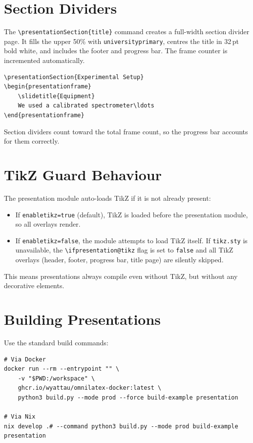 \section{Section Dividers}

The \texttt{\textbackslash presentationSection\{title\}} command creates a
full-width section divider page.  It fills the upper 50\% with
\texttt{universityprimary}, centres the title in 32\,pt bold white, and
includes the footer and progress bar.  The frame counter is incremented
automatically.

\begin{verbatim}
\presentationSection{Experimental Setup}
\begin{presentationframe}
    \slidetitle{Equipment}
    We used a calibrated spectrometer\ldots
\end{presentationframe}
\end{verbatim}

Section dividers count toward the total frame count, so the progress bar
accounts for them correctly.

\section{TikZ Guard Behaviour}

The presentation module auto-loads TikZ if it is not already present:

\begin{itemize}
    \item If \texttt{enabletikz=true} (default), TikZ is loaded before the
          presentation module, so all overlays render.
    \item If \texttt{enabletikz=false}, the module attempts to load TikZ
          itself.  If \texttt{tikz.sty} is unavailable, the
          \texttt{\textbackslash ifpresentation@tikz} flag is set to
          \texttt{false} and all TikZ overlays (header, footer, progress bar,
          title page) are silently skipped.
\end{itemize}

This means presentations always compile even without TikZ, but without any
decorative elements.

\section{Building Presentations}

Use the standard build commands:

\begin{verbatim}
# Via Docker
docker run --rm --entrypoint "" \
    -v "$PWD:/workspace" \
    ghcr.io/wyattau/omnilatex-docker:latest \
    python3 build.py --mode prod --force build-example presentation

# Via Nix
nix develop .# --command python3 build.py --mode prod build-example presentation
\end{verbatim}

